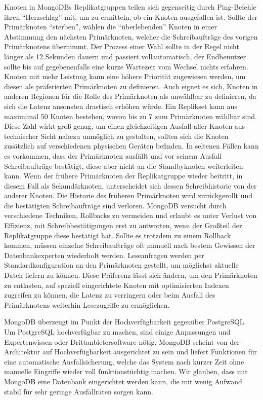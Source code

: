 Knoten in MongoDBs Replikatgruppen teilen sich gegenseitig durch Ping-Befehle ihren \enquote{Herzschlag} mit, um zu ermitteln, ob ein Knoten ausgefallen ist. Sollte der Primärknoten \enquote{sterben}, wählen die \enquote{überlebenden} Knoten in einer Abstimmung den nächsten Primärknoten, welcher die Schreibaufträge des vorigen Primärknotens übernimmt. Der Prozess einer Wahl sollte in der Regel nicht länger als 12 Sekunden dauern und passiert vollautomatisch, der Endbenutzer sollte bis auf gegebenenfalls eine kurze Wartezeit vom Wechsel nichts erfahren. Knoten mit mehr Leistung kann eine höhere Priorität zugewiesen werden, um diesen als präferierten Primärknoten zu definieren. Auch eignet es sich, Knoten in anderen Regionen für die Rolle des Primärknoten als unwählbar zu definieren, da sich die Latenz ansonsten drastisch erhöhen würde. Ein Replikset kann aus maximimal 50 Knoten bestehen, wovon bis zu 7 zum Primärknoten wählbar sind. \cite{MG1} \cite{MG2} Diese Zahl wirkt groß genug, um einen gleichzeitigen Ausfall aller Knoten aus technischer Sicht nahezu unmöglich zu gestalten, sollten sich die Knoten zusätzlich auf verschiedenen physischen Geräten befinden.
In seltenen Fällen kann es vorkommen, dass der Primärknoten ausfällt und vor seinem Ausfall Schreibaufträge bestätigt, diese aber nicht an die Standbyknoten weiterleiten kann. Wenn der frühere Primärknoten der Replikatgruppe wieder beitritt, in diesem Fall als Sekundärknoten, unterscheidet sich dessen Schreibhistorie von der anderer Knoten. Die Historie des früheren Primärknoten wird zurückgerollt und die bestätigten Schreibaufträge sind verloren. MongoDB versucht durch verschiedene Techniken, Rollbacks zu vermeiden und erlaubt es unter Verlust von Effizienz, mit Schreibbestätigungen erst zu antworten, wenn der Großteil der Replikatgruppe diese bestätigt hat. Sollte es trotzdem zu einem Rollback kommen, müssen einzelne Schreibaufträge oft manuell nach bestem Gewissen der Datenbankexperten wiederholt werden. \cite{MG3} Leseanfragen werden per Standardkonfiguration an den Primärknoten gestellt, um möglichst aktuelle Daten liefern zu können. Diese Präferenz lässt sich ändern, um den Primärknoten zu entlasten, auf speziell eingerichtete Knoten mit optimisierten Indexen zugreifen zu können, die Latenz zu verringern oder beim Ausfall des Primärknotens weiterhin Lesezugriffe zu ermöglichen.

MongoDB überzeugt im Punkt der Hochverfügbarkeit gegenüber PostgreSQL. Um PostgreSQL hochverfügbar zu machen, sind einige Anpassungen und Expertenwissen oder Drittanbietersoftware nötig. MongoDB scheint von der Architektur auf Hochverfügbarkeit ausgerichtet zu sein und liefert Funktionen für eine automatische Ausfallsicherung, welche das System nach kurzer Zeit ohne manuelle Eingriffe wieder voll funktionstüchtig machen. Wir glauben, dass mit MongoDB eine Datenbank eingerichtet werden kann, die mit wenig Aufwand stabil für sehr geringe Ausfallraten sorgen kann.

